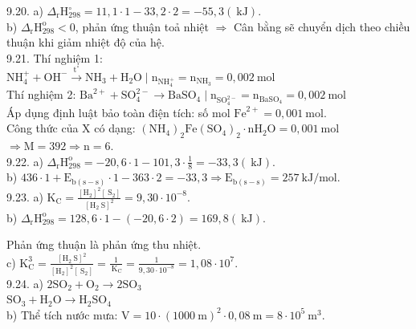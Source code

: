 \documentclass[10pt]{article}
\begin{document}
9.20. a) $\Delta_{\mathrm{r}} \mathrm{H}_{298}^{\circ}=11,1 \cdot 1-33,2 \cdot 2=-55,3(\mathrm{~kJ})$.\\
b) $\Delta_{\mathrm{r}} \mathrm{H}_{298}^{\mathrm{o}}<0$, phản ứng thuận toả nhiệt $\Rightarrow$ Cân bằng sẽ chuyển dịch theo chiều thuận khi giảm nhiệt độ của hệ.\\
9.21. Thí nghiệm 1:\\
$\mathrm{NH}_{4}^{+}+\mathrm{OH}^{-} \xrightarrow{\mathrm{t}^{\circ}} \mathrm{NH}_{3}+\mathrm{H}_{2} \mathrm{O} \mid \mathrm{n}_{\mathrm{NH}_{4}^{+}}=\mathrm{n}_{\mathrm{NH}_{3}}=0,002 \mathrm{~mol}$\\
Thí nghiệm 2: $\mathrm{Ba}^{2+}+\mathrm{SO}_{4}^{2-} \longrightarrow \mathrm{BaSO}_{4} \mid \mathrm{n}_{\mathrm{SO}_{4}^{2-}}=\mathrm{n}_{\mathrm{BaSO}_{4}}=0,002 \mathrm{~mol}$\\
Áp dụng định luật bảo toàn điện tích: số mol $\mathrm{Fe}^{2+}=0,001 \mathrm{~mol}$.\\
Công thức của X có dạng: $\left(\mathrm{NH}_{4}\right)_{2} \mathrm{Fe}\left(\mathrm{SO}_{4}\right)_{2} \cdot \mathrm{nH}_{2} \mathrm{O}=0,001 \mathrm{~mol}$\\
$\Rightarrow \mathrm{M}=392 \Rightarrow \mathrm{n}=6$.\\
9.22. a) $\Delta_{\mathrm{r}} \mathrm{H}_{298}^{\mathrm{o}}=-20,6 \cdot 1-101,3 \cdot \frac{1}{8}=-33,3(\mathrm{~kJ})$.\\
b) $436 \cdot 1+\mathrm{E}_{\mathrm{b}(\mathrm{s}-\mathrm{s})} \cdot 1-363 \cdot 2=-33,3 \Rightarrow \mathrm{E}_{\mathrm{b}(\mathrm{s}-\mathrm{s})}=257 \mathrm{~kJ} / \mathrm{mol}$.\\
9.23. a) $\mathrm{K}_{\mathrm{C}}=\frac{\left[\mathrm{H}_{2}\right]^{2}\left[\mathrm{~S}_{2}\right]}{\left[\mathrm{H}_{2} \mathrm{~S}\right]^{2}}=9,30 \cdot 10^{-8}$.\\
b) $\Delta_{\mathrm{r}} \mathrm{H}_{298}^{\mathrm{o}}=128,6 \cdot 1-(-20,6 \cdot 2)=169,8(\mathrm{~kJ})$.

Phản ứng thuận là phản ứng thu nhiệt.\\
c) $\mathrm{K}_{\mathrm{C}}^{3}=\frac{\left[\mathrm{H}_{2} \mathrm{~S}\right]^{2}}{\left[\mathrm{H}_{2}\right]^{2}\left[\mathrm{~S}_{2}\right]}=\frac{1}{\mathrm{~K}_{\mathrm{C}}}=\frac{1}{9,30 \cdot 10^{-8}}=1,08 \cdot 10^{7}$.\\
9.24. a) $2 \mathrm{SO}_{2}+\mathrm{O}_{2} \longrightarrow 2 \mathrm{SO}_{3}$\\
$\mathrm{SO}_{3}+\mathrm{H}_{2} \mathrm{O} \longrightarrow \mathrm{H}_{2} \mathrm{SO}_{4}$\\
b) Thể tích nước mưa: $\mathrm{V}=10 \cdot(1000 \mathrm{~m})^{2} \cdot 0,08 \mathrm{~m}=8 \cdot 10^{5} \mathrm{~m}^{3}$.
\end{document}
